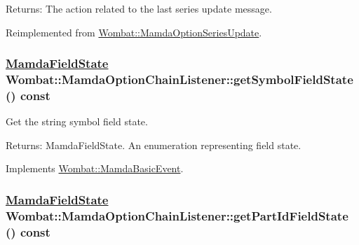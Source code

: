 \begin{Desc}
\item[Returns:]The action related to the last series update message. \end{Desc}


Reimplemented from \hyperlink{classWombat_1_1MamdaOptionSeriesUpdate_ae453033ff713e3a48251f3f747946db}{Wombat::Mamda\-Option\-Series\-Update}.\hypertarget{classWombat_1_1MamdaOptionChainListener_7329d289f1c07002d10f50a04a1ea8fc}{
\subsubsection[getSymbolFieldState]{\setlength{\rightskip}{0pt plus 5cm}\hyperlink{namespaceWombat_93aac974f2ab713554fd12a1fa3b7d2a}{Mamda\-Field\-State} Wombat::Mamda\-Option\-Chain\-Listener::get\-Symbol\-Field\-State () const}}
\label{classWombat_1_1MamdaOptionChainListener_7329d289f1c07002d10f50a04a1ea8fc}


Get the string symbol field state. 

\begin{Desc}
\item[Returns:]Mamda\-Field\-State. An enumeration representing field state. \end{Desc}


Implements \hyperlink{classWombat_1_1MamdaBasicEvent_ef95e19f4babb0e5ea8549d6cf29d13f}{Wombat::Mamda\-Basic\-Event}.\hypertarget{classWombat_1_1MamdaOptionChainListener_8766c380f388bac26dc3ba51312b8e09}{
\subsubsection[getPartIdFieldState]{\setlength{\rightskip}{0pt plus 5cm}\hyperlink{namespaceWombat_93aac974f2ab713554fd12a1fa3b7d2a}{Mamda\-Field\-State} Wombat::Mamda\-Option\-Chain\-Listener::get\-Part\-Id\-Field\-State () const}}
\label{classWombat_1_1MamdaOptionChainListener_8766c380f388bac26dc3ba51312b8e09}


